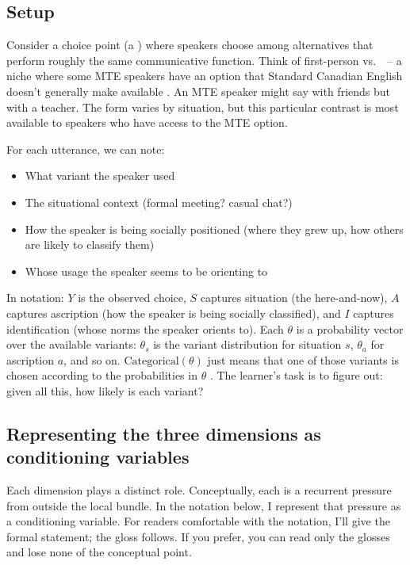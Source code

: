 \documentclass[11pt,letterpaper]{article}
\begin{document}
\subsection{Setup}

Consider a choice point (a ) where speakers choose among alternatives that perform roughly the same communicative function. Think of first-person  vs.\ ~-- a niche where some MTE speakers have an option that Standard Canadian English doesn't generally make available \citep{denis2016mans}. An MTE speaker might say  with friends but  with a teacher. The form varies by situation, but this particular contrast is most available to speakers who have access to the MTE option.

For each utterance, we can note:
\begin{itemize}
    \item What variant the speaker used
    \item The situational context (formal meeting? casual chat?)
    \item How the speaker is being socially positioned (where they grew up, how others are likely to classify them)
    \item Whose usage the speaker seems to be orienting to
\end{itemize}

In notation: $Y$ is the observed choice, $S$ captures situation (the here-and-now), $A$ captures ascription (how the speaker is being socially classified), and $I$ captures identification (whose norms the speaker orients to). Each $\theta$ is a probability vector over the available variants: $\theta_s$ is the variant distribution for situation $s$, $\theta_a$ for ascription $a$, and so on. $\text{Categorical}(\theta)$ just means that one of those variants is chosen according to the probabilities in $\theta$ \citep[Section~3.4]{GelmanBDA3}. The learner's task is to figure out: given all this, how likely is each variant?

\subsection{Representing the three dimensions as conditioning variables}

Each dimension plays a distinct role. Conceptually, each is a recurrent pressure from outside the local bundle. In the notation below, I represent that pressure as a conditioning variable. For readers comfortable with the notation, I'll give the formal statement; the gloss follows. If you prefer, you can read only the glosses and lose none of the conceptual point.
\end{document}
